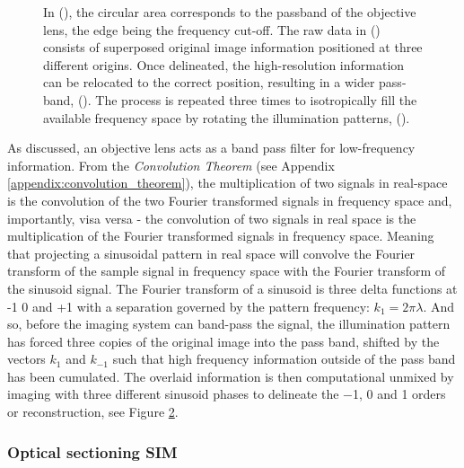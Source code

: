 \begin{figure}
\begin{subfigure}[b]{0.15\textwidth}
        \label{fig:sim_full_flower}
    \end{subfigure}
    \caption{
        In (), the circular area corresponds to the passband of the \gls{objective lens}, the edge being the frequency cut-off.
        The raw data in () consists of superposed original image information
        positioned at three different origins.
        Once delineated, the high-resolution information can be relocated to the correct position, resulting in a wider pass-band, ().
        The process is repeated three times to isotropically fill the available frequency space by rotating the illumination patterns, ().
        }
    \label{fig:sim_flowers}
\end{figure}

As discussed, an \gls{objective lens} acts as a band pass filter for low-frequency information.
From the \emph{Convolution Theorem} (see Appendix \ref{appendix:convolution_theorem}), the multiplication of two signals in real-space is the convolution of the two Fourier transformed signals in frequency space and, importantly, visa versa -
the convolution of two signals in real space is the multiplication of the Fourier transformed signals in frequency space.
Meaning that projecting a sinusoidal pattern in real space will convolve the Fourier transform of the sample signal in frequency space with the Fourier transform of the sinusoid signal.
The Fourier transform of a sinusoid is three delta functions at -1 0 and +1 with a separation governed by the pattern frequency: $k_1 = {2\pi}{\lambda}$.
And so, before the imaging system can band-pass the signal, the illumination pattern has forced three copies of the original image into the pass band, shifted by the vectors $k_1$ and $k_{-1}$ such that high frequency information outside of the pass band has been cumulated.
The overlaid information is then computational unmixed by imaging with three different sinusoid phases to delineate the \SI{-1}{}, \SI{0}{} and \SI{+1}{} orders or reconstruction, see Figure \ref{fig:sim_flowers}.

\subsubsection{Optical sectioning SIM}

